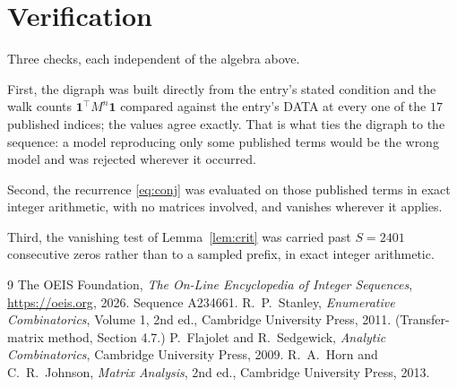 \documentclass[11pt,a4paper]{article}
\theoremstyle{plain}
\theoremstyle{definition}
\begin{document}
\section{Verification}

Three checks, each independent of the algebra above.

First, the digraph was built directly from the entry's stated condition and the walk counts
$\mathbf{1}^{\!\top}M^{n}\mathbf{1}$ compared against the entry's DATA at every one of
the $17$ published indices; the values agree exactly. That is what ties the digraph to
the sequence: a model reproducing only some published terms would be the wrong model and
was rejected wherever it occurred.

Second, the recurrence \eqref{eq:conj} was evaluated on those published terms in exact
integer arithmetic, with no matrices involved, and vanishes wherever it applies.

Third, the vanishing test of Lemma~\ref{lem:crit} was carried past $S=2401$ consecutive
zeros rather than to a sampled prefix, in exact integer arithmetic.

\begin{thebibliography}{9}
 The OEIS Foundation, \emph{The On-Line Encyclopedia of Integer
Sequences}, \url{https://oeis.org}, 2026. Sequence A234661.
 R.~P.~Stanley, \emph{Enumerative Combinatorics}, Volume 1, 2nd ed.,
Cambridge University Press, 2011. (Transfer-matrix method, Section 4.7.)
 P.~Flajolet and R.~Sedgewick, \emph{Analytic Combinatorics}, Cambridge
University Press, 2009.
 R.~A.~Horn and C.~R.~Johnson, \emph{Matrix Analysis}, 2nd ed., Cambridge
University Press, 2013.
\end{thebibliography}
\end{document}
